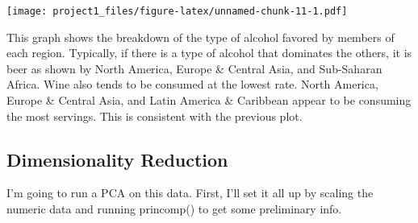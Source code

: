 \documentclass[]{article}
\newenvironment{Shaded}{\begin{snugshade}}{\end{snugshade}}
\newcommand{\KeywordTok}[1]{\textcolor[rgb]{0.13,0.29,0.53}{\textbf{#1}}}
\newcommand{\DataTypeTok}[1]{\textcolor[rgb]{0.13,0.29,0.53}{#1}}
\newcommand{\DecValTok}[1]{\textcolor[rgb]{0.00,0.00,0.81}{#1}}
\newcommand{\StringTok}[1]{\textcolor[rgb]{0.31,0.60,0.02}{#1}}
\newcommand{\OperatorTok}[1]{\textcolor[rgb]{0.81,0.36,0.00}{\textbf{#1}}}
\newcommand{\NormalTok}[1]{#1}
\begin{document}
\begin{Shaded}
\end{Shaded}

\texttt{[image: project1\_files/figure-latex/unnamed-chunk-11-1.pdf]}

This graph shows the breakdown of the type of alcohol favored by members
of each region. Typically, if there is a type of alcohol that dominates
the others, it is beer as shown by North America, Europe \& Central
Asia, and Sub-Saharan Africa. Wine also tends to be consumed at the
lowest rate. North America, Europe \& Central Asia, and Latin America \&
Caribbean appear to be consuming the most servings. This is consistent
with the previous plot.

\subsection{Dimensionality Reduction}\label{dimensionality-reduction}

I'm going to run a PCA on this data. First, I'll set it all up by
scaling the numeric data and running princomp() to get some preliminary
info.

\begin{Shaded}
\end{Shaded}
\end{document}
